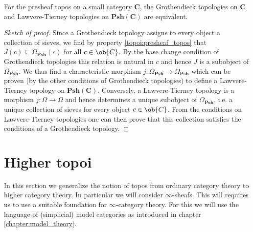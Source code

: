 
    \begin{property}
        For the presheaf topos on a small category $\mathbf{C}$, the Grothendieck topologies on $\mathbf{C}$ and Lawvere-Tierney topologies on $\mathbf{Psh}(\mathbf{C})$ are equivalent.
        \begin{proof}[Sketch of proof]
            Since a Grothendieck topology assigns to every object a collection of sieves, we find by property \ref{topoi:presheaf_topos} that $J(c)\subseteq\Omega_{\mathbf{Psh}}(c)$ for all $c\in\ob{C}$. By the base change condition of Grothendieck topologies this relation is natural in $c$ and hence $J$ is a subobject of $\Omega_{\mathbf{Psh}}$. We thus find a characteristic morphism $j:\Omega_{\mathbf{Psh}}\rightarrow\Omega_{\mathbf{Psh}}$ which can be proven (by the other conditions of Grothendieck topologies) to define a Lawvere-Tierney topology on $\mathbf{Psh}(\mathbf{C})$. Conversely, a Lawvere-Tierney topology is a morphism $j:\Omega\rightarrow\Omega$ and hence determines a unique subobject of $\Omega_{\mathbf{Psh}}$, i.e. a unique collection of sieves for every object $c\in\ob{C}$. From the conditions on Lawvere-Tierney topologies one can then prove that this collection satisfies the conditions of a Grothendieck topology.
        \end{proof}
    \end{property}

\section{Higher topoi}

    In this section we generalize the notion of topos from ordinary category theory to higher category theory. In particular we will consider $\infty$-sheafs. This will requires us to use a suitable foundation for $\infty$-category theory. For this we will use the language of (simplicial) model categories as introduced in chapter \ref{chapter:model_theory}.

